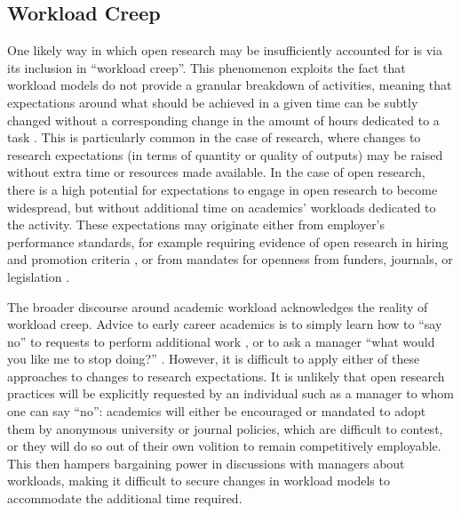 \documentclass[meta, authordate]{jote-new-article}
\begin{document}
\subsection{Workload Creep}



One likely way in which open research may be insufficiently accounted for is via its inclusion in “workload creep”. This phenomenon exploits the fact that workload models do not provide a granular breakdown of activities, meaning that expectations around what should be achieved in a given time can be subtly changed without a corresponding change in the amount of hours dedicated to a task \parencites{Long2020}. This is particularly common in the case of research, where changes to research expectations (in terms of quantity or quality of outputs) may be raised without extra time or resources made available. In the case of open research, there is a high potential for expectations to engage in open research to become widespread, but without additional time on academics’ workloads dedicated to the activity. These expectations may originate either from employer’s performance standards, for example requiring evidence of open research in hiring and promotion criteria \parencites{Gärtner2022}{Robson2021}, or from mandates for openness from funders, journals, or legislation \parencites{Nosek2019}.



The broader discourse around academic workload acknowledges the reality of workload creep. Advice to early career academics is to simply learn how to “say no” to requests to perform additional work \parencites{Somerville2021}, or to ask a manager “what would you like me to stop doing?” \parencites{Williams2022}. However, it is difficult to apply either of these approaches to changes to research expectations. It is unlikely that open research practices will be explicitly requested by an individual such as a manager to whom one can say “no”: academics will either be encouraged or mandated to adopt them by anonymous university or journal policies, which are difficult to contest, or they will do so out of their own volition to remain competitively employable. This then hampers bargaining power in discussions with managers about workloads, making it difficult to secure changes in workload models to accommodate the additional time required.
\end{document}
